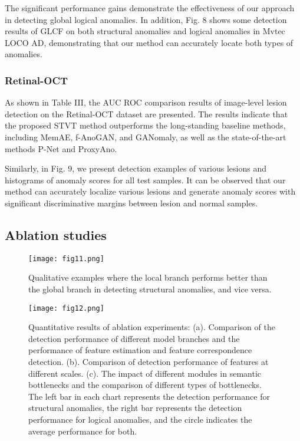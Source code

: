 \documentclass[lettersize,journal]{IEEEtran}
\begin{document}
The significant performance gains demonstrate the effectiveness of our approach in detecting global logical anomalies. In addition, Fig. 8 shows some detection results of GLCF on both structural anomalies and logical anomalies in Mvtec LOCO AD, demonstrating that our method can accurately locate both types of anomalies.

\subsubsection{\textbf{Retinal-OCT}}


As shown in Table III, the AUC ROC comparison results of image-level lesion detection on the Retinal-OCT dataset are presented. The results indicate that the proposed STVT method outperforms the long-standing baseline methods, including MemAE\cite{r6}, f-AnoGAN\cite{r36}, and GANomaly\cite{r9}, as well as the state-of-the-art methods P-Net\cite{r41} and ProxyAno\cite{r42}.

Similarly, in Fig. 9, we present detection examples of various lesions and histograms of anomaly scores for all test samples. It can be observed that our method can accurately localize various lesions and generate anomaly scores with significant discriminative margins between lesion and normal samples.


\subsection{Ablation studies}


 \begin{figure}[t]\centering
\texttt{[image: fig11.png]}
\caption{Qualitative examples where the local branch performs better than the global branch in detecting structural anomalies, and vice versa.}
\label{FIG0}
\end{figure} 

\begin{figure*}[t]
\centerline{\texttt{[image: fig12.png]}}
\caption[width=\textwidth]{
Quantitative results of ablation experiments: (a). Comparison of the detection performance of different model branches and the performance of feature estimation and feature correspondence detection. (b). Comparison of detection performance of features at different scales. (c). The impact of different modules in semantic bottlenecks and the comparison of different types of bottlenecks. The left bar in each chart represents the detection performance for structural anomalies, the right bar represents the detection performance for logical anomalies, and the circle indicates the average performance for both.
}

\label{fig1}
\end{figure*}
\end{document}
